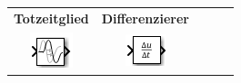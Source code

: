 \documentclass[margin=normal]{tex/hsrzf}
\begin{document}
\begin{tabular}{|c|c|c|c|c|}
      \hline
      \textbf{Totzeitglied}                                         &
      \textbf{Differenzierer}                                       &
      \textbf{}                                                     &
      \textbf{}                                                     &
      \textbf{}                                                       \\
      \includegraphics[]{img/matlab/transport_delay_block_icon.png} &
      \includegraphics[]{img/matlab/derivative_block_icon.png}      &
                                                                    &
                                                                    &
      \\
      \hline
\end{tabular}


\end{document}
